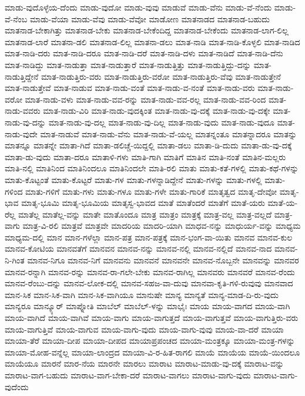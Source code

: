 {ಮಾಡು-ವುದೊಳ್ಳೆಯ-ದೆಂದು
ಮಾಡು-ವುದೋ
ಮಾಡು-ವುವು
ಮಾಡುವೆ
ಮಾಡು-ವೆನು
ಮಾಡು-ವೆ-ನೆಂದು
ಮಾಡು-ವೆ-ನೆಂಬ
ಮಾಡು-ವೆಯಾ
ಮಾಡು-ವೆವು
ಮಾಡು-ವೆವೋ
ಮಾಡೋಣ
ಮಾತನಾಡದ
ಮಾತನಾಡ-ಬಹುದು
ಮಾತನಾಡ-ಬೇಕಾಗಿತ್ತು
ಮಾತನಾಡ-ಬೇಕು
ಮಾತನಾಡ-ಬೇಕೆಂದಿದ್ದ
ಮಾತನಾಡ-ಬೇಕೆಂದು
ಮಾತನಾಡ-ಲಾಗ-ಲಿಲ್ಲ
ಮಾತನಾಡ-ಲಾರೆ
ಮಾತನಾ-ಡಲಿ
ಮಾತನಾಡ-ಲಿಲ್ಲ
ಮಾತನಾ-ಡಲು
ಮಾತ-ನಾಡಿ
ಮಾತ-ನಾಡಿ-ಕೊಳ್ಳಲಿ
ಮಾತ-ನಾಡಿದ
ಮಾತ-ನಾಡಿ-ದರು
ಮಾತ-ನಾಡಿ-ದರೂ
ಮಾತ-ನಾಡಿ-ದರೆ
ಮಾತ-ನಾಡಿ-ದಳು
ಮಾತ-ನಾಡಿದೆ
ಮಾತ-ನಾಡಿ-ದೆನು
ಮಾತ-ನಾಡಿದ್ದು
ಮಾತ-ನಾಡುತ್ತಾ
ಮಾತ-ನಾಡುತ್ತಾರೆ
ಮಾತ-ನಾಡುತ್ತಿತ್ತು
ಮಾತ-ನಾಡುತ್ತಿದ್ದು-ದನ್ನು
ಮಾತ-ನಾಡುತ್ತಿದ್ದೇನೆ
ಮಾತ-ನಾಡುತ್ತಿರು-ವರು
ಮಾತ-ನಾಡುತ್ತಿರು-ವರೋ
ಮಾತ-ನಾಡುತ್ತಿರು-ವೆವು
ಮಾತ-ನಾಡುತ್ತೇನೆ
ಮಾತ-ನಾಡುತ್ತೇವೆ
ಮಾತ-ನಾಡುವ
ಮಾತ-ನಾಡು-ವಂತೆ
ಮಾತ-ನಾಡು-ವ-ನಂತೆ
ಮಾತ-ನಾಡು-ವರು
ಮಾತ-ನಾಡು-ವರೋ
ಮಾತ-ನಾಡು-ವಳು
ಮಾತ-ನಾಡು-ವವ-ರನ್ನು
ಮಾತ-ನಾಡು-ವವ-ರಲ್ಲ
ಮಾತ-ನಾಡು-ವವ-ರಿಂದ
ಮಾತ-ನಾಡು-ವವರು
ಮಾತ-ನಾಡು-ವಿರಿ
ಮಾತ-ನಾಡು-ವುದಕ್ಕಿಂತ
ಮಾತ-ನಾಡು-ವು-ದಕ್ಕೆ
ಮಾತ-ನಾಡು-ವು-ದಕ್ಕೇ
ಮಾತ-ನಾಡು-ವು-ದನ್ನು
ಮಾತ-ನಾಡು-ವು-ದಲ್ಲ
ಮಾತ-ನಾಡು-ವು-ದಿಲ್ಲ
ಮಾತ-ನಾಡು-ವುದು
ಮಾತ-ನಾಡು-ವುದೂ
ಮಾತ-ನಾಡು-ವುದೇ
ಮಾತ-ನಾಡುವೆ
ಮಾತ-ನಾಡು-ವೆನು
ಮಾತ-ನಾಡು-ವೆ-ಯಲ್ಲ
ಮಾತನ್ನಂತೂ
ಮಾತನ್ನಾದರೂ
ಮಾತನ್ನು
ಮಾತನ್ನೂ
ಮಾತನ್ನೇ
ಮಾತಾ-ಗಿದೆ
ಮಾತಾ-ಡಲಿಚ್ಚೆ-ಯಿದ್ದಲ್ಲಿ
ಮಾತಾ-ಡಲು
ಮಾತಾ-ಡಿ-ದುದು
ಮಾತಾ-ಡು-ವು-ದಕ್ಕೆ
ಮಾತಾ-ಡು-ವುದು
ಮಾತಾ-ದರೂ
ಮಾತಾಳಿ-ಗಳು
ಮಾತಿ-ಗಾಗಿ
ಮಾತಿಗೆ
ಮಾತಿನ
ಮಾತಿ-ನಂತೆ
ಮಾತಿನ-ಮಲ್ಲರು
ಮಾತಿ-ನಲ್ಲಿ
ಮಾತಿನಿಂದ
ಮಾತಿನಿಂದಲೂ
ಮಾತಿನಿಂದಲೇ
ಮಾತಿ-ರಲಿ
ಮಾತು
ಮಾತು-ಕತೆ-ಗಳಲ್ಲಿ
ಮಾತು-ಕಥೆ-ಗಳನ್ನು
ಮಾತು-ಕೊಟ್ಟಂತೆ
ಮಾತು-ಕೊಟ್ಟರೆ
ಮಾತು-ಗಳ
ಮಾತು-ಗಳನ್ನಾಡಿದ್ದೇನೆ
ಮಾತು-ಗಳನ್ನು
ಮಾತು-ಗಳಲ್ಲಿ
ಮಾತು-ಗಳಿಂದ
ಮಾತು-ಗಳಿಗೆ
ಮಾತು-ಗಳು
ಮಾತು-ಗಳೂ
ಮಾತು-ಗಳೇ
ಮಾತು-ಗಾರಿಕೆ
ಮಾತೃತ್ವದ
ಮಾತೃ-ದೇವೋ
ಮಾತೃ-ಭಾವ
ಮಾತೃ-ಭೂಮಿ
ಮಾತೃ-ಭೂಮಿಯ
ಮಾತೃಸ್ವ-ಭಾವದ
ಮಾತೆ
ಮಾತೆಂದರೆ
ಮಾತೆಗೆ
ಮಾತೆ-ಯರು
ಮಾತೆ-ಯ-ರೆಲ್ಲ
ಮಾತೆಲ್ಲ
ಮಾತೆಲ್ಲ-ವನ್ನು
ಮಾತೇ
ಮಾತೊಂದೂ
ಮಾತ್ರ
ಮಾತ್ರಂ
ಮಾತ್ರಕ್ಕೆ
ಮಾತ್ರ-ವಲ್ಲ
ಮಾತ್ರ-ವಲ್ಲದೆ
ಮಾತ್ರ-ವಾಗು
ಮಾತ್ರ-ವಿ-ರಲಿ
ಮಾತ್ರವೆ
ಮಾತ್ರವೇ
ಮಾದರಿಯ
ಮಾದರಿ-ಯಾಗಿ
ಮಾಧವ-ನನ್ನು
ಮಾಧುರ್ಯ-ವನ್ನು
ಮಾಧ್ಯಮ
ಮಾಧ್ಯಮ-ದಲ್ಲಿ
ಮಾನ
ಮಾನ-ಗಳೆಲ್ಲಾ
ಮಾನ-ಪತ್ರ
ಮಾನ-ಪತ್ರಕ್ಕೆ
ಮಾನ-ಭಂಗ-ವಾ-ಯಿತು
ಮಾನವ
ಮಾನವ-ಕುಲ
ಮಾನವ-ಕೋಟಿಯ
ಮಾನವತೆಗೆ
ಮಾನವನ
ಮಾನವ-ನನ್ನು
ಮಾನವ-ನಲ್ಲಿ
ಮಾನವ-ನಲ್ಲಿದೆ
ಮಾನವ-ನಾದ
ಮಾನವ-ನಿ-ಗಿಂತ
ಮಾನವ-ನಿಗೂ
ಮಾನವ-ನಿಗೆ
ಮಾನವನು
ಮಾನವನೆ
ಮಾನವನೇ
ಮಾನವ-ನೊಬ್ಬನೇ
ಮಾನವನ್ನು
ಮಾನವರ
ಮಾನವ-ರನ್ನಾಗಿ
ಮಾನವ-ರನ್ನು
ಮಾನವ-ರಾ-ಗಲೇ-ಬೇಕು
ಮಾನವ-ರಾಗಿಲ್ಲ
ಮಾನವರು
ಮಾನವರೆ
ಮಾನವ-ರೆಂದು
ಮಾನವ-ರೆಂಬು-ದನ್ನು
ಮಾನವ-ಲೋಕ-ದಲ್ಲಿ
ಮಾನವ-ಸಹಜ-ವಾ-ದುವು
ಮಾನವಾ-ಕೃತಿ-ಗಳಿ-ರುವುವು
ಮಾನವಾದ
ಮಾನ-ಸಿಕ
ಮಾನ-ಸಿಕ-ವಾಗಿ
ಮಾನ-ಸಿಕ-ವಾಗಿಯೂ
ಮಾನುಷೇ
ಮಾನ್ಯ
ಮಾನ್ಯತೆ
ಮಾನ್ಯ-ಮಾಡ-ದಿ-ರು-ವುದು
ಮಾನ್ಯರೂ
ಮಾನ್ಕ್ಯೂರ್
ಮಾಪ್ನೋತಿ
ಮಾಬೆಲ್
ಮಾಬೆಲ್-ಳನ್ನು
ಮಾಭೈಃ
ಮಾಯ
ಮಾಯ-ವಾಗದ
ಮಾಯ-ವಾಗಿ
ಮಾಯ-ವಾಗಿದೆ
ಮಾಯ-ವಾಗಿವೆ
ಮಾಯ-ವಾಗು
ಮಾಯ-ವಾಗುತ್ತದೆ
ಮಾಯ-ವಾಗುತ್ತವೆ
ಮಾಯ-ವಾಗುತ್ತಿರು-ವರು
ಮಾಯ-ವಾಗುತ್ತಿವೆ
ಮಾಯ-ವಾಗುವ
ಮಾಯ-ವಾಗು-ವುದು
ಮಾಯ-ವಾಗು-ವುವು
ಮಾಯ-ವಾ-ದರೆ
ಮಾಯಾ
ಮಾಯಾ-ತೆರೆ
ಮಾಯಾ-ದೀಪ
ಮಾಯಾ-ದೀಪದ
ಮಾಯಾಪ್ರಪಂಚದ
ಮಾಯಾ-ಮಂತ್ರಕ್ಕೂ
ಮಾಯಾ-ಮಂತ್ರ-ಗಳನ್ನು
ಮಾಯಾ-ಮೋಹ-ವನ್ನೆಲ್ಲ
ಮಾಯಾ-ಲಾಂದ್ರದ
ಮಾಯಾ-ವಿ-ರ-ಹಿತ-ರಾಗಲಿ
ಮಾಯೆ
ಮಾಯೆಯ
ಮಾಯೆ-ಯಿಂದಲೂ
ಮಾಯೆಯೂ
ಮಾರನೆ
ಮಾರ-ನೆಯ
ಮಾರನೇ
ಮಾರಲು
ಮಾರಾಟ
ಮಾರಾಟ-ಮಾಡು-ವು-ದಕ್ಕೆ
ಮಾರಾಟ-ವನ್ನು
ಮಾರಾಟ-ವಾಗ-ಬಹುದು
ಮಾರಾಟ-ವಾಗ-ಬೇಕಾ-ದರೆ
ಮಾರಾಟ-ವಾಗಲು
ಮಾರಾಟ-ವಾಗು-ವುದು
ಮಾರಾಟ-ವಾಗು-ವುದೆಂದು
}
